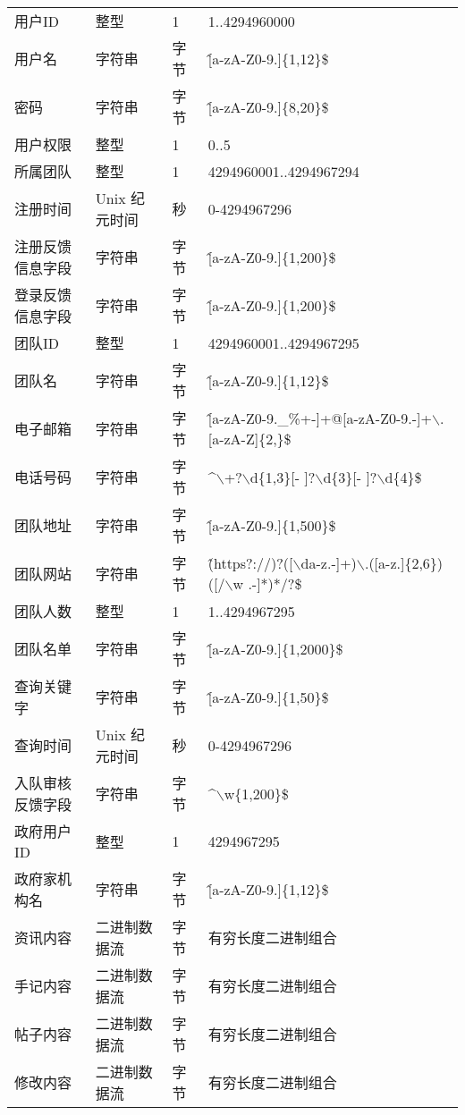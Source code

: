 \begin{longtable}{p{3.5cm}llp{4cm}}
        用户ID  & 整型  & 1 & 1..4294960000 \\ 
        用户名 & 字符串 & 字节 & \^[a-zA-Z0-9.]\{1,12\}\$ \\ 
        密码 & 字符串 & 字节 & \^[a-zA-Z0-9.]\{8,20\}\$ \\ 
        用户权限 & 整型  & 1 & 0..5 \\ 
         所属团队 & 整型  & 1 & 4294960001..4294967294 \\
        注册时间 & Unix 纪元时间 & 秒 & 0-4294967296 \\ 
        注册反馈信息字段 & 字符串 & 字节 & \^[a-zA-Z0-9.]\{1,200\}\$ \\
        登录反馈信息字段 & 字符串 & 字节 & \^[a-zA-Z0-9.]\{1,200\}\$ \\ 
        团队ID & 整型  & 1 & 4294960001..4294967295 \\ 
        团队名 & 字符串 & 字节 & \^[a-zA-Z0-9.]\{1,12\}\$ \\ 
        电子邮箱 & 字符串 & 字节 & \^[a-zA-Z0-9.\_\%+-]+@[a-zA-Z0-9.-]+$\backslash$.[a-zA-Z]\{2,\}\$ \\ 
        电话号码 & 字符串 & 字节 & \^$\backslash$+?$\backslash$d\{1,3\}[- ]?$\backslash$d\{3\}[- ]?$\backslash$d\{4\}\$ \\
        团队地址 & 字符串 & 字节 & \^[a-zA-Z0-9.]\{1,500\}\$ \\
        团队网站 & 字符串 & 字节 & \^(https?://)?([$\backslash$da-z.-]+)$\backslash$.([a-z.]\{2,6\})([/$\backslash$w .-]*)*/?\$ \\ 
        团队人数 & 整型  & 1 & 1..4294967295 \\
        团队名单 & 字符串 & 字节 & \^[a-zA-Z0-9.]\{1,2000\}\$ \\ 
        查询关键字 & 字符串 & 字节 & \^[a-zA-Z0-9.]\{1,50\}\$ \\ 
        查询时间 & Unix 纪元时间 & 秒 & 0-4294967296 \\ 
        入队审核反馈字段 & 字符串 & 字节 & \^$\backslash$w\{1,200\}\$ \\ 
        政府用户 ID & 整型  & 1 & 4294967295 \\ 
        政府家机构名 & 字符串 & 字节 & \^[a-zA-Z0-9.]\{1,12\}\$ \\ 
        资讯内容 & 二进制数据流 & 字节 & 有穷长度二进制组合 \\ 
        手记内容 & 二进制数据流 & 字节 & 有穷长度二进制组合 \\ 
        帖子内容 & 二进制数据流 & 字节 & 有穷长度二进制组合 \\ 
        修改内容 & 二进制数据流 & 字节 & 有穷长度二进制组合 \\ 

\end{longtable}
